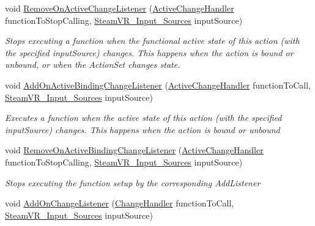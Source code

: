 \begin{DoxyCompactItemize}
void \mbox{\hyperlink{class_valve_1_1_v_r_1_1_steam_v_r___action___single_ae56434d507e319e8a216e724728dbe76}{Remove\+On\+Active\+Change\+Listener}} (\mbox{\hyperlink{class_valve_1_1_v_r_1_1_steam_v_r___action___single_a45ad70dbb8a58191f373b7ae098b833b}{Active\+Change\+Handler}} function\+To\+Stop\+Calling, \mbox{\hyperlink{namespace_valve_1_1_v_r_a82e5bf501cc3aa155444ee3f0662853f}{Steam\+V\+R\+\_\+\+Input\+\_\+\+Sources}} input\+Source)
\begin{DoxyCompactList}\small\item\em Stops executing a function when the {\itshape functional} active state of this action (with the specified input\+Source) changes. This happens when the action is bound or unbound, or when the Action\+Set changes state. \end{DoxyCompactList}\item 
void \mbox{\hyperlink{class_valve_1_1_v_r_1_1_steam_v_r___action___single_a1b05b455c3734492cc844b3afca8a59e}{Add\+On\+Active\+Binding\+Change\+Listener}} (\mbox{\hyperlink{class_valve_1_1_v_r_1_1_steam_v_r___action___single_a45ad70dbb8a58191f373b7ae098b833b}{Active\+Change\+Handler}} function\+To\+Call, \mbox{\hyperlink{namespace_valve_1_1_v_r_a82e5bf501cc3aa155444ee3f0662853f}{Steam\+V\+R\+\_\+\+Input\+\_\+\+Sources}} input\+Source)
\begin{DoxyCompactList}\small\item\em Executes a function when the active state of this action (with the specified input\+Source) changes. This happens when the action is bound or unbound \end{DoxyCompactList}\item 
void \mbox{\hyperlink{class_valve_1_1_v_r_1_1_steam_v_r___action___single_ae17685502cf60155bf806900ee0f197e}{Remove\+On\+Active\+Binding\+Change\+Listener}} (\mbox{\hyperlink{class_valve_1_1_v_r_1_1_steam_v_r___action___single_a45ad70dbb8a58191f373b7ae098b833b}{Active\+Change\+Handler}} function\+To\+Stop\+Calling, \mbox{\hyperlink{namespace_valve_1_1_v_r_a82e5bf501cc3aa155444ee3f0662853f}{Steam\+V\+R\+\_\+\+Input\+\_\+\+Sources}} input\+Source)
\begin{DoxyCompactList}\small\item\em Stops executing the function setup by the corresponding Add\+Listener \end{DoxyCompactList}\item 
void \mbox{\hyperlink{class_valve_1_1_v_r_1_1_steam_v_r___action___single_ac3ae13457eeec363b6eefdf13ed6cc84}{Add\+On\+Change\+Listener}} (\mbox{\hyperlink{class_valve_1_1_v_r_1_1_steam_v_r___action___single_ae0c72c83dccd88a0235e8a831d62116e}{Change\+Handler}} function\+To\+Call, \mbox{\hyperlink{namespace_valve_1_1_v_r_a82e5bf501cc3aa155444ee3f0662853f}{Steam\+V\+R\+\_\+\+Input\+\_\+\+Sources}} input\+Source)

\end{DoxyCompactItemize}
